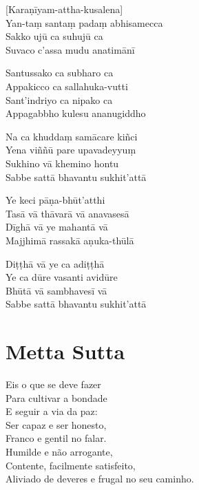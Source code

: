 [Karaṇīyam-attha-kusalena]\\
Yan-taṃ santaṃ padaṃ abhisamecca\\
Sakko ujū ca suhujū ca\\
Suvaco c'assa mudu anatimānī

Santussako ca subharo ca\\
Appakicco ca sallahuka-vutti\\
Sant'indriyo ca nipako ca\\
Appagabbho kulesu ananugiddho

Na ca khuddaṃ samācare kiñci\\
Yena viññū pare upavadeyyuṃ\\
Sukhino vā khemino hontu\\
Sabbe sattā bhavantu sukhit'attā

Ye keci pāṇa-bhūt'atthi\\
Tasā vā thāvarā vā anavasesā\\
Dīghā vā ye mahantā vā\\
Majjhimā rassakā aṇuka-thūlā

Diṭṭhā vā ye ca adiṭṭhā\\
Ye ca dūre vasanti avidūre\\
Bhūtā vā sambhavesī vā\\
Sabbe sattā bhavantu sukhit'attā

\chapter[Metta Sutta]{Metta Sutta}


\begin{leader}
\end{leader}

Eis o que se deve fazer\\
Para cultivar a bondade\\
E seguir a via da paz:\\
Ser capaz e ser honesto,\\
Franco e gentil no falar.\\
Humilde e não arrogante,\\
Contente, facilmente satisfeito,\\
Aliviado de deveres e frugal no seu caminho.

